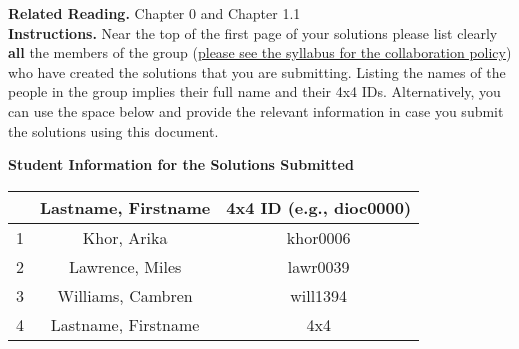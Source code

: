 \noindent\textbf{Related Reading.} Chapter 0 and Chapter 1.1\\
\noindent\textbf{Instructions.} Near the top of the first page of your solutions please list clearly \textbf{all} the members of the group (\underline{please see the syllabus for the collaboration policy}) who have created the solutions that you are submitting. Listing the names of the people in the group implies their full name and their 4x4 IDs.
Alternatively, you can use the space below and provide the relevant information 
in case you submit the solutions using this document.\\ 
\noindent\makebox[\linewidth]{\rule{\columnwidth}{2pt}}


\begin{center}
\textbf{Student Information for the Solutions Submitted}
\end{center}

\begin{center}
\begin{tabular}{c|c|c|}
\cline{2-3}
 & Lastname, Firstname & 4x4 ID (e.g., dioc0000) \\
\hline
\multicolumn{1}{|c|}{1} & Khor, Arika & khor0006 \\
\hline
\multicolumn{1}{|c|}{2} & Lawrence, Miles & lawr0039 \\
\hline
\multicolumn{1}{|c|}{3} & Williams, Cambren & will1394 \\
\hline
\multicolumn{1}{|c|}{4} & Lastname, Firstname & 4x4 \\
\hline
\end{tabular}

\end{center}

\thispagestyle{empty}






